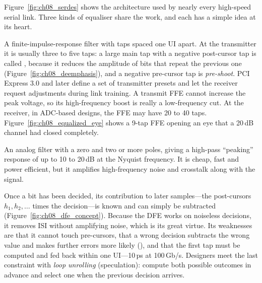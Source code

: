 Figure~\ref{fig:ch08_serdes} shows the architecture used by nearly every high-speed serial
link. Three kinds of equaliser share the work, and each has a simple idea at its heart.
\begin{description}[style=nextline,leftmargin=1.2em,font=\sffamily\bfseries\small\color{navy}]
\item[Feed-forward equaliser (FFE).] A finite-impulse-response filter with taps spaced one UI
apart. At the transmitter it is usually three to five taps: a large main tap with a negative
post-cursor tap is called , because it reduces the amplitude of bits that
repeat the previous one (Figure~\ref{fig:ch08_deemphasis}), and a negative pre-cursor tap is
\emph{pre-shoot}. PCI Express 3.0 and later define a set of transmitter presets and let the
receiver request adjustments during link training. A transmit FFE cannot increase the peak
voltage, so its high-frequency boost is really a low-frequency cut. At the receiver, in
ADC-based designs, the FFE may have 20 to 40 taps. Figure~\ref{fig:ch08_equalized_eye} shows a
9-tap FFE opening an eye that a 20\,dB channel had closed completely.
\item[Continuous-time linear equaliser (CTLE).] An analog filter with a zero and two or more
poles, giving a high-pass ``peaking'' response of up to 10 to 20\,dB at the Nyquist frequency.
It is cheap, fast and power efficient, but it amplifies high-frequency noise and crosstalk
along with the signal.
\item[Decision-feedback equaliser (DFE).] Once a bit has been decided, its contribution to later
samples---the post-cursors $h_1,h_2,\dots$ times the decision---is known and can simply be
subtracted (Figure~\ref{fig:ch08_dfe_concept}). Because the DFE works on noiseless decisions,
it removes ISI without amplifying noise, which is its great virtue. Its weaknesses are that it
cannot touch pre-cursors, that a wrong decision subtracts the wrong value and makes further
errors more likely (), and that the first tap must be computed and fed
back within one UI---10\,ps at 100\,Gb/s. Designers meet the last constraint with \emph{loop
unrolling} (speculation): compute both possible outcomes in advance and select one when the
previous decision arrives.
\end{description}


